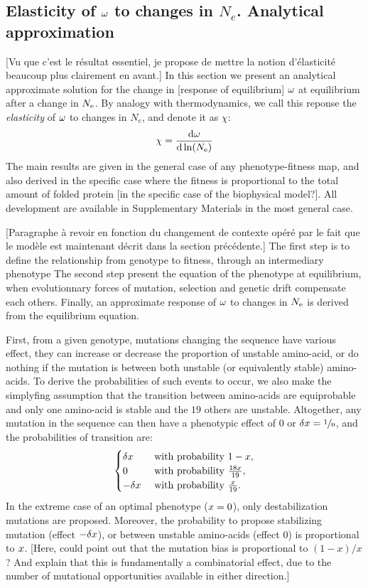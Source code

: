 \documentclass{article}
\begin{document}
	\subsection*{Elasticity of $\omega$ to changes in $N_e$. Analytical approximation}
	
	[Vu que c'est le résultat essentiel, je propose de mettre la notion d'élasticité beaucoup plus clairement en avant.]
	In this section we present an analytical approximate solution for the change in [response of equilibrium] $\omega$ at equilibrium after a change in $N_{\mathrm{e}}$. By analogy with thermodynamics, we call this reponse the \emph{elasticity} of $\omega$ to changes in $N_e$, and denote it as $\chi$:
	\begin{align}
	\chi = \frac{ \mathrm{d} \omega}{\mathrm{d} \ln (N_{\mathrm{e}})}
	\end{align}
	The main results are given in the general case of any phenotype-fitness map, and also derived in the specific case where the fitness is proportional to the total amount of folded protein [in the specific case of the biophysical model?].
	All development are available in Supplementary Materials in the most general case.
	
	[Paragraphe à revoir en fonction du changement de contexte opéré par le fait que le modèle est maintenant décrit dans la section précédente.]
	The first step is to define the relationship from genotype to fitness, through an intermediary phenotype
	The second step present the equation of the phenotype at equilibrium, when evolutionnary forces of mutation, selection and genetic drift compensate each others.
	Finally, an approximate response of $\omega$ to changes in $N_{\mathrm{e}}$ is derived from the equilibrium equation.
	
	First, from a given genotype, mutations changing the sequence have various effect, they can increase or decrease the proportion of unstable amino-acid, or do nothing if the mutation is between both unstable (or equivalently stable) amino-acids.
	To derive the probabilities of such events to occur, we also make the simplyfing assumption that the transition between amino-acids are equiprobable and only one amino-acid is stable and the $19$ others are unstable.
	Altogether, any mutation in the sequence can then have a phenotypic effect of $0$ or $\delta x=\sfrac{1}{\text{n}}$, and the probabilities of transition are:
	\begin{gather}
	\begin{cases}
	\delta x &\text{ with probability } 1-x, \\
	0 &\text{ with probability } \frac{18 x }{19}, \\
	-\delta x &\text{ with probability } \frac{x}{19}.\\
	\end{cases} \label{eq:proba}
	\end{gather}
	In the extreme case of an optimal phenotype ($x = 0$), only destabilization mutations are proposed.
	Moreover, the probability to propose stabilizing mutation (effect $-\delta x$), or between unstable amino-acids (effect $0$) is proportional to $x$. 
	[Here, could point out that the mutation bias is proportional to $(1-x)/x$? And explain that this is fundamentally a combinatorial effect, due to the number of mutational opportunities available in either direction.]
	
\end{document}
